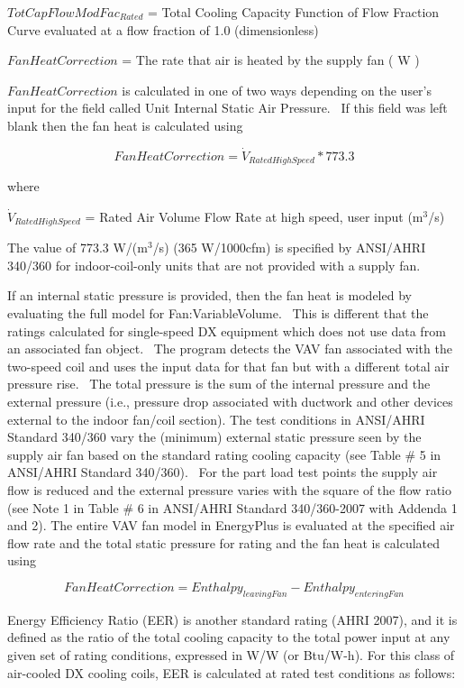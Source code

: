\(TotCapFlowModFa{c_{Rated}}\) = Total Cooling Capacity Function of Flow Fraction Curve evaluated at a flow fraction of 1.0 (dimensionless)

\(FanHeatCorrection\) = The rate that air is heated by the supply fan ( W )

\(FanHeatCorrection\) is calculated in one of two ways depending on the user's input for the field called Unit Internal Static Air Pressure.~ If this field was left blank then the fan heat is calculated using

\begin{equation}
FanHeatCorrection = {\dot V_{RatedHighSpeed}}*773.3
\end{equation}

where

\({\dot V_{RatedHighSpeed}}\) = Rated Air Volume Flow Rate at high speed, user input (m\(^{3}\)/s)

The value of 773.3 W/(m\(^{3}\)/s) (365 W/1000cfm) is specified by ANSI/AHRI 340/360 for indoor-coil-only units that are not provided with a supply fan.

If an internal static pressure is provided, then the fan heat is modeled by evaluating the full model for Fan:VariableVolume.~ This is different that the ratings calculated for single-speed DX equipment which does not use data from an associated fan object.~ The program detects the VAV fan associated with the two-speed coil and uses the input data for that fan but with a different total air pressure rise.~ The total pressure is the sum of the internal pressure and the external pressure (i.e., pressure drop associated with ductwork and other devices external to the indoor fan/coil section). The test conditions in ANSI/AHRI Standard 340/360 vary the (minimum) external static pressure seen by the supply air fan based on the standard rating cooling capacity (see Table \# 5 in ANSI/AHRI Standard 340/360).~ For the part load test points the supply air flow is reduced and the external pressure varies with the square of the flow ratio (see Note 1 in Table \# 6 in ANSI/AHRI Standard 340/360-2007 with Addenda 1 and 2). The entire VAV fan model in EnergyPlus is evaluated at the specified air flow rate and the total static pressure for rating and the fan heat is calculated using

\begin{equation}
FanHeatCorrection = Enthalp{y_{leavingFan}} - Enthalp{y_{enteringFan}}
\end{equation}

Energy Efficiency Ratio (EER) is another standard rating (AHRI 2007), and it is defined as the ratio of the total cooling capacity to the total power input at any given set of rating conditions, expressed in W/W (or Btu/W-h). For this class of air-cooled DX cooling coils, EER is calculated at rated test conditions as follows:

